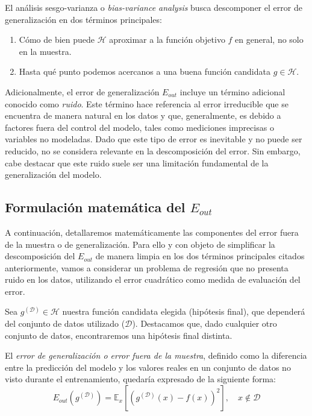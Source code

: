 El análisis sesgo-varianza o \emph{bias-variance analysis} busca descomponer el error de generalización en dos términos principales:

\begin{enumerate}
    \item Cómo de bien puede $\mathcal{H}$ aproximar a la función objetivo $f$ en general, no solo en la muestra.
    \item Hasta qué punto podemos acercanos a una buena función candidata $g \in \mathcal{H}$.\newline
\end{enumerate}

Adicionalmente, el error de generalización $E_{out}$ incluye un término adicional conocido como \textit{ruido}. Este término hace referencia al error irreducible que se encuentra de manera natural en los datos y que, generalmente, es debido a factores fuera del control del modelo, tales como mediciones imprecisas o variables no modeladas. Dado que este tipo de error es inevitable y no puede ser reducido, no se considera relevante en la descomposición del error. Sin embargo, cabe destacar que este ruido suele ser una limitación fundamental de la generalización del modelo.\newline

\subsection{Formulación matemática del $E_{out}$}\label{sec:formulacion-matematica-Eout}
A continuación, detallaremos matemáticamente las componentes del error fuera de la muestra o de generalización. Para ello y con objeto de simplificar la descomposición del $E_{out}$ de manera limpia en los dos términos principales citados anteriormente, vamos a considerar un problema de regresión que no presenta ruido en los datos, utilizando el error cuadrático como medida de evaluación del error.\newline

Sea $g^{\mathcal{(D)}} \in \mathcal{H}$ nuestra función candidata elegida (hipótesis final), que dependerá del conjunto de datos utilizado ($\mathcal{D}$). Destacamos que, dado cualquier otro conjunto de datos, encontraremos una hipótesis final distinta.\newline

El \emph{error de generalización o error fuera de la muestra}, definido como la diferencia entre la predicción del modelo y los valores reales en un conjunto de datos no visto durante el entrenamiento, quedaría expresado de la siguiente forma:
\begin{equation}\label{eq:E_out1}
    E_{out}(g^{\mathcal{(D)}}) = \mathbb{E}_{x}[{(g^{\mathcal{(D)}}(x) - f(x))}^2], \quad x \notin \mathcal{D}
\end{equation}

